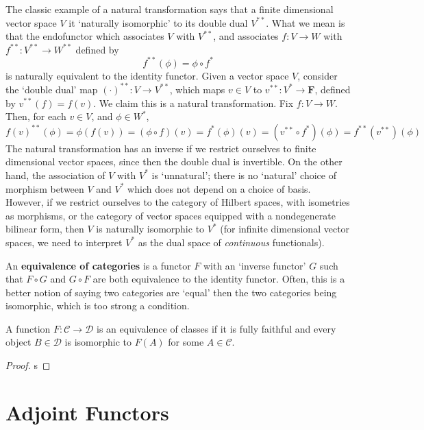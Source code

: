 \begin{example}
    The classic example of a natural transformation says that a finite dimensional vector space $V$ it `naturally isomorphic' to its double dual $V^{**}$. What we mean is that the endofunctor which associates $V$ with $V^{**}$, and associates $f: V \to W$ with $f^{**}: V^{**} \to W^{**}$ defined by
    \[ f^{**}(\phi) = \phi \circ f^* \]
    is naturally equivalent to the identity functor. Given a vector space $V$, consider the `double dual' map $(\cdot)^{**}: V \to V^{**}$, which maps $v \in V$ to $v^{**}: V^* \to \mathbf{F}$, defined by $v^{**}(f) = f(v)$. We claim this is a natural transformation. Fix $f: V \to W$. Then, for each $v \in V$, and $\phi \in W^*$,
    \[ f(v)^{**}(\phi) = \phi(f(v)) = (\phi \circ f)(v) = f^*(\phi)(v) = (v^{**} \circ f^*)(\phi) = f^{**}(v^{**})(\phi) \]
    The natural transformation has an inverse if we restrict ourselves to finite dimensional vector spaces, since then the double dual is invertible. On the other hand, the association of $V$ with $V^*$ is `unnatural'; there is no `natural' choice of morphism between $V$ and $V^*$ which does not depend on a choice of basis. However, if we restrict ourselves to the category of Hilbert spaces, with isometries as morphisms, or the category of vector spaces equipped with a nondegenerate bilinear form, then $V$ is naturally isomorphic to $V^*$ (for infinite dimensional vector spaces, we need to interpret $V^*$ as the dual space of {\it continuous} functionals).
\end{example}

An {\bf equivalence of categories} is a functor $F$ with an `inverse functor' $G$ such that $F \circ G$ and $G \circ F$ are both equivalence to the identity functor. Often, this is a better notion of saying two categories are `equal' then the two categories being isomorphic, which is too strong a condition.

\begin{theorem}
    A function $F: \mathcal{C} \to \mathcal{D}$ is an equivalence of classes if it is fully faithful and every object $B \in \mathcal{D}$ is isomorphic to $F(A)$ for some $A \in \mathcal{C}$.
\end{theorem}
\begin{proof}
    s
\end{proof}

\section{Adjoint Functors}

